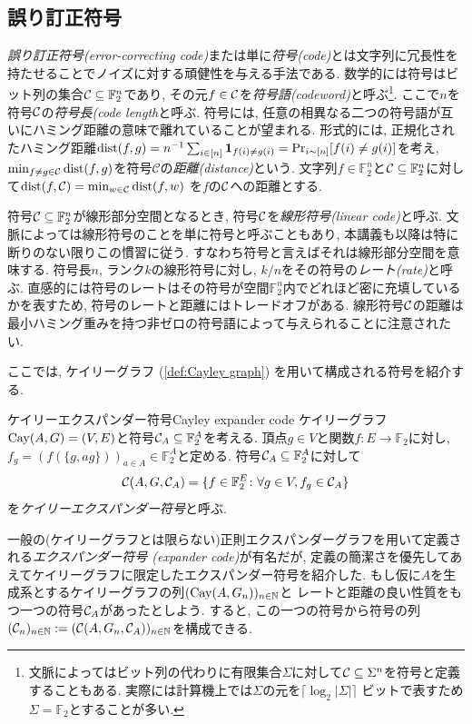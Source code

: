 \subsection{誤り訂正符号}
\emph{誤り訂正符号(error-correcting code)}または単に\emph{符号(code)}とは文字列に冗長性を持たせることでノイズに対する頑健性を与える手法である.
数学的には符号はビット列の集合$\mathcal{C}\subseteq\mathbb{F}_2^n$であり, その元$f\in\mathcal{C}$を\emph{符号語(codeword)}と呼ぶ\footnote{文脈によってはビット列の代わりに有限集合$\Sigma$に対して$\mathcal{C}\subseteq\Sigma^n$を符号と定義することもある. 実際には計算機上では$\Sigma$の元を$\lceil\log_2 |\Sigma|\rceil$ ビットで表すため$\Sigma=\mathbb{F}_2$とすることが多い.}.
ここで$n$を符号$\mathcal{C}$の\emph{符号長(code length}と呼ぶ.
符号には, 任意の相異なる二つの符号語が互いにハミング距離の意味で離れていることが望まれる.
形式的には, 正規化されたハミング距離$\mathrm{dist}(f,g)=n^{-1}\sum_{i\in[n]}\mathbf{1}_{f(i)\neq g(i)}=\Pr_{i\sim[n]}[f(i)\neq g(i)]$を考え, $\min_{f\neq g\in\mathcal{C}}\mathrm{dist}(f,g)$を符号$\mathcal{C}$の\emph{距離(distance)}という.
文字列$f\in\mathbb{F}_2^n$と$\mathcal{C}\subseteq\mathbb{F}_2^n$に対して$\mathrm{dist}(f,\mathcal{C})=\min_{w\in\mathcal{C}}\mathrm{dist}(f,w)$
を$f$の$\mathcal{C}$への距離とする.


符号$\mathcal{C}\subseteq\mathbb{F}_2^n$が線形部分空間となるとき, 符号$\mathcal{C}$を\emph{線形符号(linear code)}と呼ぶ.
文脈によっては線形符号のことを単に符号と呼ぶこともあり,
本講義も以降は特に断りのない限りこの慣習に従う.
すなわち符号と言えばそれは線形部分空間を意味する.
符号長$n$, ランク$k$の線形符号に対し,
$k/n$をその符号の\emph{レート(rate)}と呼ぶ.
直感的には符号のレートはその符号が空間$\mathbb{F}_2^n$内でどれほど密に充填しているかを表すため,
符号のレートと距離にはトレードオフがある.
線形符号$\mathcal{C}$の距離は最小ハミング重みを持つ非ゼロの符号語によって与えられることに注意されたい.

ここでは, ケイリーグラフ (\cref{def:Cayley graph}) を用いて構成される符号を紹介する.
\begin{definition}{ケイリーエクスパンダー符号}{Cayley expander code}
    ケイリーグラフ$\mathrm{Cay}(A,G)=(V,E)$と符号$\mathcal{C}_A\subseteq\mathbb{F}_2^A$を考える.
    頂点$g\in V$と関数$f\colon E \to \mathbb{F}_2$に対し, $f_g=(f(\{g,ag\}))_{a\in A}\in \mathbb{F}_2^A$と定める.
    符号$\mathcal{C}_A\subseteq \mathbb{F}_2^A$に対して
    \begin{align*}
        \mathcal{C}(A,G,\mathcal{C}_A)=\{f\in\mathbb{F}_2^E\colon \forall g\in V, f_g \in \mathcal{C}_A\}
    \end{align*}
    を\emph{ケイリーエクスパンダー符号}と呼ぶ.
\end{definition}
一般の(ケイリーグラフとは限らない)正則エクスパンダーグラフを用いて定義される\emph{エクスパンダー符号 (expander code)}が有名だが, 定義の簡潔さを優先してあえてケイリーグラフに限定したエクスパンダー符号を紹介した.
もし仮に$A$を生成系とするケイリーグラフの列$(\mathrm{Cay}(A,G_n))_{n\in\mathbb{N}}$と
レートと距離の良い性質をもつ一つの符号$\mathcal{C}_A$があったとしよう.
すると, この一つの符号から符号の列$(\mathcal{C}_n)_{n\in\mathbb{N}} \mathrel{:=} (\mathcal{C}(A,G_n,\mathcal{C}_A))_{n\in\mathbb{N}}$を構成できる.


